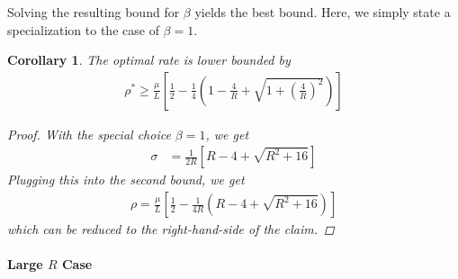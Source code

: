 \documentclass{article}
\newtheorem{corollary}{Corollary}
\begin{document}
Solving the resulting bound for $\beta$ yields the best bound. Here, we simply state a specialization to the case of $\beta=1$.
\begin{corollary}
The optimal rate is lower bounded by 
\begin{align}
\rho^* \ge \frac \mu L \left[ \frac 12 - \frac 14 \left( 1 - \frac 4R + \sqrt{1+ \left( \frac{4}{R}\right)^2} \right) \right]  
\end{align}
\begin{proof} With the special choice $\beta=1$, we get 
\begin{align}
\sigma & = \frac{1}{2R} \left[ R-4 + \sqrt{R^2+16} \right] 
\end{align}
Plugging this into the second bound, we get 
\begin{align}
\rho = \frac \mu L \left[ \frac 12 - \frac 1{4R} \left( R-4 + \sqrt{R^2+16} \right)  \right]
\end{align}
which can be reduced to the right-hand-side of the claim.
\end{proof}
\end{corollary}

\paragraph{Large $R$ Case}
\end{document}
